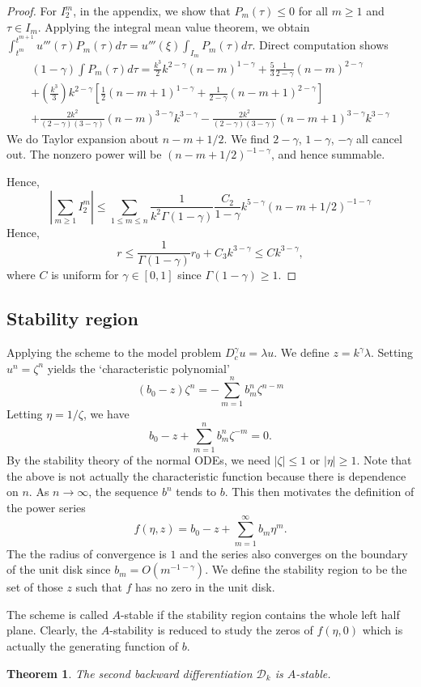\documentclass[11pt]{article}
\newtheorem{thm}{Theorem}
\begin{document}
\begin{proof}
For $I_2^m$, in the appendix, we show that $P_m(\tau)\le 0$ for all $m\ge 1$ and $\tau\in I_m$. Applying the integral mean value theorem, we obtain  $\int_{t^m}^{t^{m+1}}u'''(\tau)P_m(\tau)d\tau
=u'''(\xi) \int_{I_m}P_m(\tau)d\tau$. Direct computation shows
\begin{multline*}
(1-\gamma)\int P_m(\tau)d\tau=\frac{k^3}{2}k^{2-\gamma}(n-m)^{1-\gamma}+
\frac{5}{3}\frac{1}{2-\gamma}(n-m)^{2-\gamma}\\
+(\frac{k^3}{3})k^{2-\gamma}[\frac{1}{2}(n-m+1)^{1-\gamma}+\frac{1}{2-\gamma}(n-m+1)^{2-\gamma}]\\
+\frac{2k^2}{(2-\gamma)(3-\gamma)}(n-m)^{3-\gamma}k^{3-\gamma}
-\frac{2k^2}{(2-\gamma)(3-\gamma)}(n-m+1)^{3-\gamma}k^{3-\gamma}
\end{multline*}
We do Taylor expansion about $n-m+1/2$. We find $2-\gamma$, $1-\gamma$, $-\gamma$ all cancel out. 
The nonzero power will be $(n-m+1/2)^{-1-\gamma}$, and hence summable.

Hence,  $$
|\sum_{m\ge 1}I_2^m|\le\sum_{1\le m\le n}\frac{1}{k^2\Gamma(1-\gamma)} \frac{C_2}{1-\gamma}k^{5-\gamma}(n-m+1/2)^{-1-\gamma}
$$
Hence, $$
r\le \frac{1}{\Gamma(1-\gamma)}r_0+C_3k^{3-\gamma}\le Ck^{3-\gamma},
$$
where $C$ is uniform for $\gamma\in [0,1]$ since $\Gamma(1-\gamma)\ge 1$.
\end{proof}

\subsection{Stability region}
Applying the scheme to the model problem $D_c^{\gamma}u=\lambda u$. We define $z=k^{\gamma}\lambda$. Setting $u^n=\zeta^n$ yields the `characteristic polynomial' $$
(b_0-z)\zeta^n=-\sum_{m=1}^n b_m^n \zeta^{n-m}
$$
Letting $\eta=1/\zeta$, we have $$
b_0-z+\sum_{m=1}^n b_m^n\zeta^{-m}=0.
$$
By the stability theory of the normal ODEs, we need $|\zeta|\le 1$ or $|\eta|\ge 1$. Note that the above is not actually the characteristic function because there is dependence on $n$. As $n\to\infty$, the sequence $b^n$ tends to $b$. This then motivates the definition of the power series $$
f(\eta, z)=b_0-z+\sum_{m=1}^{\infty} b_m\eta^m.
$$
The the radius of convergence is $1$ and the series also converges on the boundary of the unit disk since $b_m=O(m^{-1-\gamma})$. We define the stability region to be the set of those $z$ such that $f$ has no zero in the unit disk.

The scheme is called $A$-stable if the stability region contains the whole left half plane. Clearly, the $A$-stability is reduced to study the zeros of $f(\eta, 0)$ which is actually the generating function of $b$.
\begin{thm}
The second backward differentiation $\mathcal{D}_k$ is $A$-stable. 
\end{thm}
\end{document}
